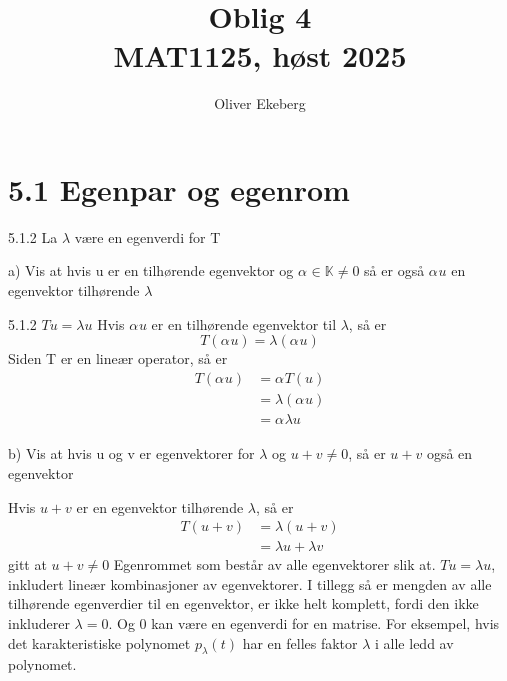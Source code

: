 \documentclass[a4paper,norsk]{article}
\title{Oblig 4 \\ MAT1125, høst 2025}
\author{Oliver Ekeberg}
\begin{document}
\maketitle

\tableofcontents

\section*{5.1 Egenpar og egenrom}

\begin{oppgavebox}{5.1.2}{}
La $ \lambda $  være en egenverdi for T

a) Vis at hvis u er en tilhørende egenvektor og $ \alpha_{}^{} \in \mathbb{K} \neq 0$  så er også $ \alpha_{}^{} u  $ en egenvektor tilhørende $ \lambda  $

\begin{proofbox}{5.1.2}{}
    $Tu = \lambda u$
    Hvis $ \alpha_{}^{} u $ er en tilhørende egenvektor til $ \lambda  $, så er 
    \[
        T( \alpha_{}^{} u) = \lambda \left( \alpha_{}^{} u \right) 
    \]
    Siden T er en lineær operator, så er 
    \begin{align*}
        T \left( \alpha_{}^{} u \right) &= \alpha_{}^{}  T(u) \\
        &= \lambda \left( \alpha_{}^{} u \right) \\
        &= \alpha_{}^{}  \lambda u
    \end{align*}
\end{proofbox}

b) Vis at hvis u og v er egenvektorer for $ \lambda  $ og $ u+v\neq 0 $, så er $ u+v $ også en egenvektor   

\begin{proofbox}{}
    Hvis $ u+v $ er en egenvektor tilhørende $ \lambda  $, så er 
    \begin{align*}
        T \left( u+v \right) &= \lambda \left( u+v \right)  \\
        &= \lambda u + \lambda v
    \end{align*}
    gitt at $ u+v \neq 0 $
    Egenrommet som består av alle egenvektorer slik at. $ Tu = \lambda u $, inkludert lineær kombinasjoner av egenvektorer. I tillegg så er mengden av alle tilhørende egenverdier til en egenvektor, er ikke helt komplett, fordi den ikke inkluderer $ \lambda =0 $. Og 0 kan være en egenverdi for en matrise. For eksempel, hvis det karakteristiske polynomet $ p_{ \lambda }(t) $ har en felles faktor $ \lambda  $ i alle ledd av polynomet.    
\end{proofbox}
\end{oppgavebox}
\end{document}
